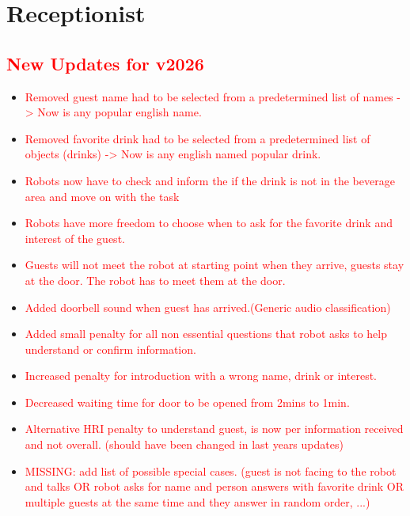 \section{Receptionist}
\label{test:receptionist}

\subsection*{\textcolor{red}{New Updates for v2026}}
	\begin{itemize}
	\item \textcolor{red}{Removed guest name had to be selected from a predetermined list of names -> Now is any popular english name.}
	\item \textcolor{red}{Removed favorite drink had to be selected from a predetermined list of objects (drinks) -> Now is any english named popular drink.}
	\item \textcolor{red}{Robots now have to check and inform the if the drink is not in the beverage area and move on with the task}
	\item \textcolor{red}{Robots have more freedom to choose when to ask for the favorite drink and interest of the guest.}
	\item \textcolor{red}{Guests will not meet the robot at starting point when they arrive, guests stay at the door. The robot has to meet them at the door.}
	\item \textcolor{red}{Added doorbell sound when guest has arrived.(Generic audio classification)}
	\item \textcolor{red}{Added small penalty for all non essential questions that robot asks to help understand or confirm information.}
	\item \textcolor{red}{Increased penalty for introduction with a wrong name, drink or interest.}
	\item \textcolor{red}{Decreased waiting time for door to be opened from 2mins to 1min.}
	\item \textcolor{red}{Alternative HRI penalty to understand guest, is now per information received and not overall. (should have been changed in last years updates)}
	\\
	\item \textcolor{red}{MISSING: add list of possible special cases. (guest is not facing to the robot and talks OR robot asks for name and person answers with favorite drink OR multiple guests at the same time and they answer in random order, ...)}
	\end{itemize}

